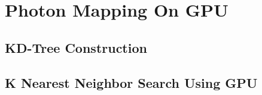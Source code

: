 
\section{Photon Mapping On GPU} 

\subsection{KD-Tree Construction} \label{subsec:kdtree_construction} 

\subsection{K Nearest Neighbor Search Using GPU}







